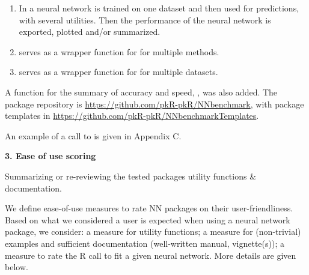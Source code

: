 \begin{enumerate}
\def\labelenumi{\arabic{enumi}.}
\tightlist
\item
  In  a neural network is trained on one
  dataset and then used for predictions, with several utilities. Then
  the performance of the neural network is exported, plotted and/or
  summarized.
\item
   serves as a wrapper function for
   for multiple methods.
\item
   serves as a wrapper function for
   for multiple datasets.
\end{enumerate}

A function for the summary of accuracy and speed, , was
also added. The package repository is
\url{https://github.com/pkR-pkR/NNbenchmark}, with package templates in
\url{https://github.com/pkR-pkR/NNbenchmarkTemplates}.

An example of a call to  is given in Appendix
C.

\textbf{3. Ease of use scoring}

Summarizing or re-reviewing the tested packages utility functions \&
documentation.

We define ease-of-use measures to rate NN packages on their
user-friendliness. Based on what we considered a user is expected when
using a neural network package, we consider: a measure for utility
functions; a measure for (non-trivial) examples and sufficient
documentation (well-written manual, vignette(s)); a measure to rate the
\textsf{R} call to fit a given neural network. More details are given
below.

